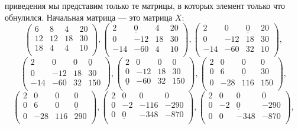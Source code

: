 \begin{algo}
\end{algo}
\noindent приведения мы представим только те матрицы, в которых элемент только что обнулился. Начальная матрица — это матрица $X$:
$$\begin{pmatrix} 
6 & 8 & 4 & 20 \\
12 & 12 & 18 & 30 \\ 
18 & 4 & 4 & 10 \\ \end{pmatrix},  
\begin{pmatrix} 
2 & \underline{0} & 4 & 20 \\
0 & -12 & 18 & 30 \\ 
-14 & -60 & 4 & 10 \\ \end{pmatrix},
\begin{pmatrix} 
2 & 0 & \underline{0} & 20 \\
0 & -12 & 18 & 30 \\ 
-14 & -60 & 32 & 10 \\ \end{pmatrix},$$
$$\begin{pmatrix} 
2 & 0 & 0 & \underline{0} \\
0 & -12 & 18 & 30 \\ 
-14 & -60 & 32 & 150 \\ \end{pmatrix},  
\begin{pmatrix} 
2 & 0 & 0 & 0 \\
0 & -12 & 18 & 30 \\ 
\underline{0} & -60 & 32 & 150 \\ \end{pmatrix},
\begin{pmatrix} 
2 & 0 & 0 & 0 \\
0 & 6 & \underline{0} & 30 \\ 
0 & -28 & 116 & 150 \\ \end{pmatrix},$$
$$\begin{pmatrix} 
2 & 0 & 0 & 0 \\
0 & 6 & 0 & \underline{0} \\ 
0 & -28 & 116 & 290 \\ \end{pmatrix},  
\begin{pmatrix} 
2 & 0 & 0 & 0 \\
0 & -2 & -116 & -290 \\ 
0 & \underline{0} & -348 & -870 \\ \end{pmatrix},
\begin{pmatrix} 
2 & 0 & 0 & 0 \\
0 & -2 & \underline{0} & -290 \\ 
0 & 0 & -348 & -870\\ \end{pmatrix},$$
